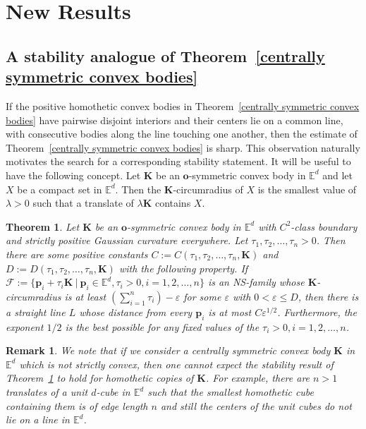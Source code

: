 \documentclass[12pt]{article}
\newtheorem{thm}{Theorem}
\newtheorem{rem}{Remark}
\newcommand{\KK}{\mathbf K}
\newcommand{\Ee}{{\mathbb E}}
\newcommand{\p}{\mathbf{p}}
\renewcommand{\o}{\mathbf{o}}
\begin{document}
\section{New Results}\label{new results}

\subsection{A stability analogue of Theorem~\ref{centrally symmetric convex bodies}}
 
If the positive homothetic convex bodies in Theorem~\ref{centrally symmetric convex bodies} have pairwise disjoint interiors and their centers lie on a common line, with consecutive bodies along the line touching one another, then the estimate of Theorem~\ref{centrally symmetric convex bodies} is sharp. This observation naturally motivates the search for a corresponding stability statement. It will be useful to have the following concept. Let $\KK$ be an $\o$-symmetric convex body in $\Ee^d$ and let $X$ be a compact set in $\Ee^d$. Then the $\KK$-circumradius of $X$ is the smallest value of $\lambda>0$ such that a translate of $\lambda \KK$ contains $X$.

\begin{thm}\label{NS-stability}
Let $\KK$ be an $\o$-symmetric convex body in $\Ee^d$ with $C^2$-class boundary and strictly positive Gaussian curvature everywhere. Let $\tau_1, \tau_2, \ldots, \tau_n >0$. Then there are some positive constants $C:=C(\tau_1,\tau_2,\ldots,\tau_n, \KK)$ and $D:=D(\tau_1,\tau_2,\ldots,\tau_n, \KK)$ with the following property. If $\mathcal{F}:= \{ \p_i + \tau_i \KK \ |\  \p_i\in \Ee^d, \tau_i>0, i=1,2,\ldots, n\}$ is an NS-family whose $\KK$-circumradius is at least $\left(\sum_{i=1}^n \tau_i\right) - \varepsilon$ for some $\varepsilon$ with $0<\varepsilon \leq D$, then there is a straight line $L$ whose distance from every $\p_i$ is at most $C \varepsilon^{1/2}$. Furthermore, the exponent $1/2$ is the best possible for any fixed values of the $\tau_i>0, i=1,2,\ldots, n$. 
\end{thm}

\begin{rem}
We note that if we consider a centrally symmetric convex body $\mathbf{K}$ in $\Ee^d$ which is not strictly convex, then one cannot expect the stability result of Theorem~\ref{NS-stability} to hold for homothetic copies of $\mathbf{K}$. For example, there are $n>1$ translates of a unit $d$-cube in $\Ee^d$ such that the smallest homothetic cube containing them is of edge length $n$ and still the centers of the unit cubes do not lie on a line in $\Ee^d$.
\end{rem}
\end{document}
